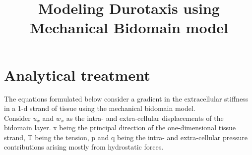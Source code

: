 \documentclass[a4paper,oneside,11pt]{report}
\title{Modeling Durotaxis using Mechanical Bidomain model}
\begin{document}
\maketitle
\section*{Analytical treatment}
The equations formulated below consider a gradient in the extracellular stiffness in a 1-d strand of tissue using the mechanical bidomain model. \\

Consider $u_{x}$ and $w_{x}$ as the intra- and extra-cellular displacements of the bidomain layer. x being the principal direction of the one-dimensional tissue strand, T being the tension, p and q being the intra- and extra-cellular pressure contributions arising mostly from hydrostatic forces. \\
\end{document}
